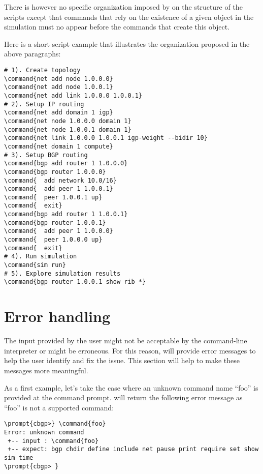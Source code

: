 There is however no specific organization imposed by
 on the structure of the scripts except that
commands that rely on the existence of a given object in the
simulation must no appear before the commands that create this object.

Here is a short script example that illustrates the organization
proposed in the above paragraphs:

\begin{Verbatim}[commandchars=\\\{\}]
# 1). Create topology
\command{net add node 1.0.0.0}
\command{net add node 1.0.0.1}
\command{net add link 1.0.0.0 1.0.0.1}
# 2). Setup IP routing
\command{net add domain 1 igp}
\command{net node 1.0.0.0 domain 1}
\command{net node 1.0.0.1 domain 1}
\command{net link 1.0.0.0 1.0.0.1 igp-weight --bidir 10}
\command{net domain 1 compute}
# 3). Setup BGP routing
\command{bgp add router 1 1.0.0.0}
\command{bgp router 1.0.0.0}
\command{  add network 10.0/16}
\command{  add peer 1 1.0.0.1}
\command{  peer 1.0.0.1 up}
\command{  exit}
\command{bgp add router 1 1.0.0.1}
\command{bgp router 1.0.0.1}
\command{  add peer 1 1.0.0.0}
\command{  peer 1.0.0.0 up}
\command{  exit}
# 4). Run simulation
\command{sim run}
# 5). Explore simulation results
\command{bgp router 1.0.0.1 show rib *}
\end{Verbatim}

\section{Error handling}
\label{sec:user-interface-error}

The input provided by the user might not be acceptable by the
command-line interpreter or might be erroneous. For this reason,
 will provide error messages to help the
user identify and fix the issue. This section will help to make these
messages more meaningful.

As a first example, let's take the case where an unknown command name
``foo'' is provided at the command prompt.  will
return the following error message as ``foo'' is not a supported
command:

\begin{Verbatim}[commandchars=\\\{\}]
\prompt{cbgp>} \command{foo}
Error: unknown command
 +-- input : \command{foo}
 +-- expect: bgp chdir define include net pause print require set show sim time 
\prompt{cbgp> }
\end{Verbatim}

